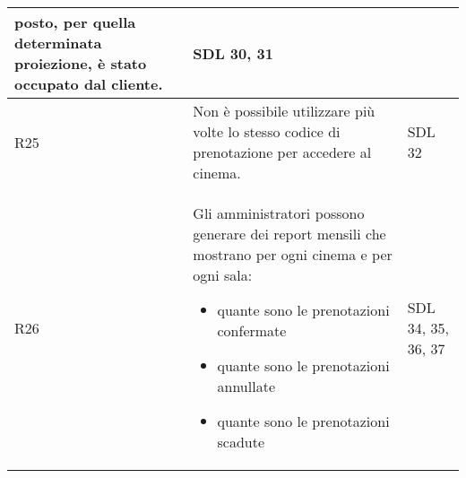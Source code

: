 \begin{longtable}{|p{0.8cm}|p{13.4cm}|p{2.1cm}|}
      posto, per quella determinata proiezione, è stato occupato dal cliente. &
      SDL 30, 31
      \\\hline
      R25                                                                     &
      Non è possibile utilizzare più volte lo stesso codice di prenotazione
      per accedere al cinema.                                                 &
      SDL 32
      \\\hline
      R26                                                                     &
      Gli amministratori possono generare dei report mensili che mostrano
      per ogni cinema e per ogni sala:
      \begin{itemize}
            \item quante sono le prenotazioni confermate
            \item quante sono le prenotazioni annullate
            \item quante sono le prenotazioni scadute
      \end{itemize}                            &
      SDL 34, 35, 36, 37
      \\\hline
\end{longtable}

\pagebreak


